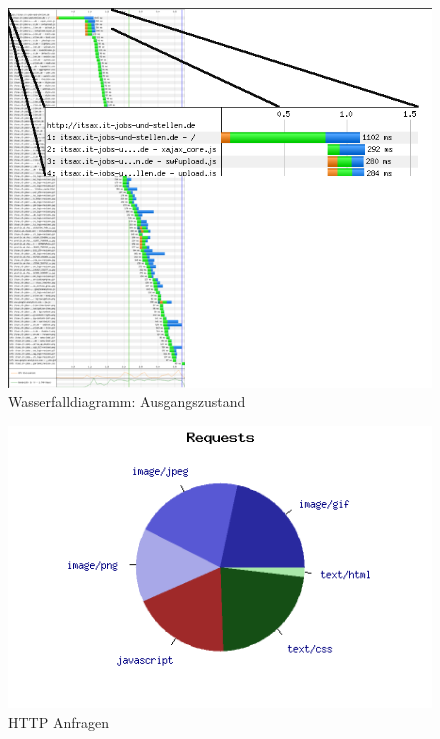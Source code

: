 \begin{figure}[htbp]
  \centering
  \includegraphics[scale=0.5]{material/start_waterfall_edited.png}
  \caption{Wasserfalldiagramm: Ausgangszustand}
  \label{fig:startwaterfall}
\end{figure}
\begin{figure}[htbp]
  \centering
  \includegraphics[scale=0.5]{material/start_request_pie.png}
  \caption{HTTP Anfragen}
  \label{fig:startrequest}
\end{figure}

